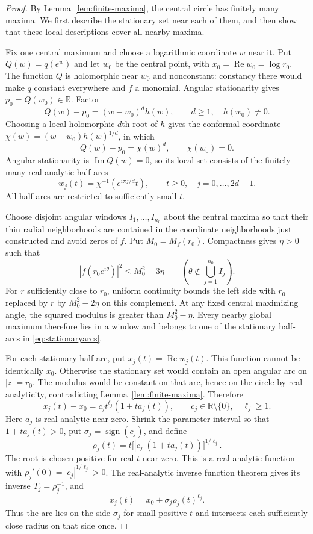 \documentclass[11pt,reqno]{amsart}
\theoremstyle{remark}
\numberwithin{equation}{section}
\newcommand{\R}{\mathbb R}
\DeclareMathOperator{\Rea}{Re}
\DeclareMathOperator{\Ima}{Im}
\begin{document}
\begin{proof}
By Lemma~\ref{lem:finite-maxima}, the central circle has finitely many
maxima. We first describe the stationary set near each of them, and
then show that these local descriptions cover all nearby maxima.

Fix one central maximum and choose a logarithmic coordinate $w$ near
it. Put $Q(w)=q(e^w)$ and let $w_0$ be the central point, with
$x_0=\Rea w_0=\log r_0$. The function $Q$ is holomorphic near
$w_0$ and nonconstant: constancy there would make $q$ constant
everywhere and $f$ a monomial. Angular stationarity gives
$p_0=Q(w_0)\in\R$. Factor
\[
 Q(w)-p_0=(w-w_0)^d h(w),\qquad d\ge1,\quad h(w_0)\ne0.
\]
Choosing a local holomorphic $d$th root of $h$ gives the conformal
coordinate $\chi(w)=(w-w_0)h(w)^{1/d}$, in which
\[
 Q(w)-p_0=\chi(w)^d,\qquad \chi(w_0)=0.
\]
Angular stationarity is $\Ima Q(w)=0$, so its local set consists of
the finitely many real-analytic half-arcs
\begin{equation}\label{eq:stationaryarcs}
 w_j(t)=\chi^{-1}(e^{i\pi j/d}t),
 \qquad t\ge0,\quad j=0,\ldots,2d-1.
\end{equation}
All half-arcs are restricted to sufficiently small $t$.

Choose disjoint angular windows $I_1,\ldots,I_{n_0}$ about the central
maxima so that their thin radial neighborhoods are contained in
the coordinate neighborhoods just constructed and avoid zeros of
$f$. Put $M_0=M_f(r_0)$. Compactness gives $\eta>0$ such that
\[
 |f(r_0e^{i\theta})|^2\le M_0^2-3\eta
 \qquad\left(\theta\notin\bigcup_{j=1}^{n_0} I_j\right).
\]
For $r$ sufficiently close to $r_0$, uniform continuity bounds the
left side with $r_0$ replaced by $r$ by $M_0^2-2\eta$ on this
complement. At any fixed central maximizing angle, the squared
modulus is greater than $M_0^2-\eta$. Every nearby global maximum
therefore lies in a window and belongs to one of the stationary
half-arcs in \eqref{eq:stationaryarcs}.

For each stationary half-arc, put $x_j(t)=\Rea w_j(t)$.
This function cannot be identically $x_0$.
Otherwise the stationary set would contain an open angular arc on
$|z|=r_0$. The modulus would be constant on that arc, hence on the
circle by real analyticity, contradicting
Lemma~\ref{lem:finite-maxima}. Therefore
\begin{equation}\label{eq:radialarc}
 x_j(t)-x_0=c_j t^{\ell_j}(1+t a_j(t)),
 \qquad c_j\in\R\setminus\{0\},\quad \ell_j\ge1.
\end{equation}
Here $a_j$ is real analytic near zero. Shrink the parameter interval
so that $1+t a_j(t)>0$, put $\sigma_j=\operatorname{sign}(c_j)$,
and define
\begin{equation}\label{eq:radialroot}
 \rho_j(t)=t\bigl[|c_j|(1+t a_j(t))\bigr]^{1/\ell_j}.
\end{equation}
The root is chosen positive for real $t$ near zero.
This is a real-analytic function with
$\rho_j'(0)=|c_j|^{1/\ell_j}>0$. The real-analytic inverse
function theorem gives its inverse $T_j=\rho_j^{-1}$, and
\[
 x_j(t)=x_0+\sigma_j\rho_j(t)^{\ell_j}.
\]
Thus the arc lies on the side $\sigma_j$ for small positive $t$
and intersects each sufficiently close radius on that side once.


\end{proof}
\end{document}

